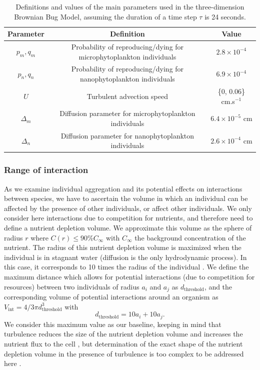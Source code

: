 \documentclass[english]{article}
\providecommand{\tabularnewline}{\\}
\begin{document}
\begin{table}[H]
\begin{centering}
\begin{tabular}{|c|c|c|}
\hline 
Parameter & Definition & Value\tabularnewline
\hline 
$p_{m},q_{m}$ & Probability of reproducing/dying for microphytoplankton individuals & $2.8\times10^{-4}$\tabularnewline
$p_{n},q_{n}$ & Probability of reproducing/dying for nanophytoplankton individuals & $6.9\times10^{-4}$\tabularnewline
$U$ & Turbulent advection speed & \{0, 0.06\} cm.s$^{-1}$\tabularnewline
$\Delta_{m}$ & Diffusion parameter for microphytoplankton individuals & $6.4\times10^{-5}$ cm\tabularnewline
$\Delta_{n}$ & Diffusion parameter for nanophytoplankton individuals & $2.6\times10^{-4}$ cm\tabularnewline
\hline 
\end{tabular}
\par\end{centering}
\caption{Definitions and values of the main parameters used in the three-dimension
Brownian Bug Model, assuming the duration of a time step $\tau$ is
24 seconds. \label{tab:Definition-and-value}}
\end{table}


\subsubsection*{Range of interaction}

As we examine individual aggregation and its potential effects on
interactions between species, we have to ascertain the volume in which
an individual can be affected by the presence of other individuals,
or affect other individuals. We only consider here interactions due
to competition for nutrients, and therefore need to define a nutrient
depletion volume. We approximate this volume as the sphere of radius
$r$ where $C(r)\leq90\%C_{\infty}$ with $C_{\infty}$ the background
concentration of the nutrient. The radius of this nutrient depletion
volume is maximized when the individual is in stagnant water (diffusion
is the only hydrodynamic process). In this case, it corresponds to
10 times the radius of the individual \citep{jumars_physical_1993,karp-boss_nutrient_1996}.
We define the maximum distance which allows for potential interactions
(due to competition for resources) between two individuals of radius
$a_{i}$ and $a_{j}$ as $d_{\text{threshold}}$, and the corresponding
volume of potential interactions around an organism as $V_{\text{int}}=4/3\pi d_{\text{threshold}}^{3}$
with
\begin{equation}
d_{\text{threshold}}=10a_{i}+10a_{j}.\label{eq:distance_interaction}
\end{equation}
We consider this maximum value as our baseline, keeping in mind that
turbulence reduces the size of the nutrient depletion volume and increases
the nutrient flux to the cell \citep{arnott_artificially_2021}, but
determination of the exact shape of the nutrient depletion volume
in the presence of turbulence is too complex to be addressed here \citep{karp-boss_nutrient_1996}.
\end{document}
